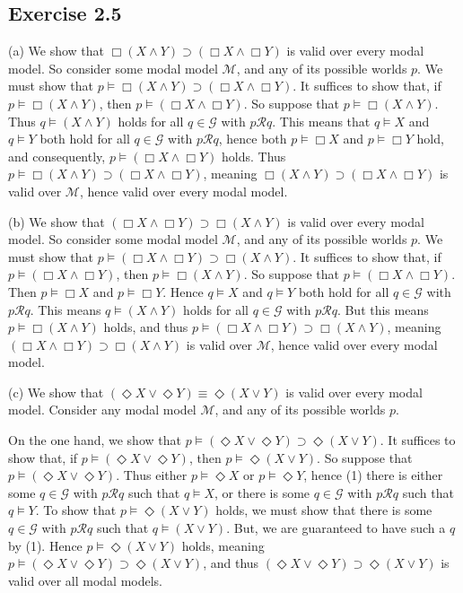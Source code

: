 \documentclass{article}
\theoremstyle{definition}
\begin{document}
\subsection*{Exercise 2.5}
(a) We show that $\Box (X\wedge Y)\supset (\Box X\wedge\Box Y)$ is valid over every modal model. So consider some 
modal model $\mathcal{M}$, and any of its possible worlds $p$. We must show that 
$p\vDash \Box (X\wedge Y)\supset (\Box X\wedge\Box Y)$. It suffices to show that, if 
$p\vDash\Box (X\wedge Y)$, then $p\vDash (\Box X\wedge\Box Y)$. So suppose that 
$p\vDash\Box (X\wedge Y)$. Thus $q\vDash (X\wedge Y)$ holds for all $q\in\mathcal{G}$ with $p\mathcal{R}q$. This means 
that $q\vDash X$ and $q\vDash Y$ both hold for all $q\in\mathcal{G}$ with $p\mathcal{R}q$, hence both 
$p\vDash\Box X$ and $p\vDash\Box Y$ hold, and consequently, $p\vDash (\Box X\wedge\Box Y)$ holds. Thus 
$p\vDash \Box (X\wedge Y)\supset (\Box X\wedge\Box Y)$, meaning 
$\Box (X\wedge Y)\supset (\Box X\wedge\Box Y)$ is valid over $\mathcal{M}$, hence valid over 
every modal model. 

(b) We show that $(\Box X\wedge\Box Y)\supset\Box (X\wedge Y)$ is valid over every modal model. 
So consider some modal model $\mathcal{M}$, and any of its possible worlds $p$. We must show that 
$p\vDash(\Box X\wedge\Box Y)\supset\Box (X\wedge Y)$. It suffices to show that, if
$p\vDash (\Box X\wedge\Box Y)$, then $p\vDash\Box (X\wedge Y)$. So suppose that
$p\vDash (\Box X\wedge\Box Y)$. Then $p\vDash\Box X$ and $p\vDash\Box Y$. Hence 
$q\vDash X$ and $q\vDash Y$ both hold for all $q\in\mathcal{G}$ with $p\mathcal{R}q$. This means 
$q\vDash (X\wedge Y)$ holds for all $q\in\mathcal{G}$ with $p\mathcal{R}q$. But this means 
$p\vDash\Box (X\wedge Y)$ holds, and thus $p\vDash(\Box X\wedge\Box Y)\supset\Box (X\wedge Y)$,
meaning $(\Box X\wedge\Box Y)\supset\Box (X\wedge Y)$ is valid over $\mathcal{M}$, hence valid over 
every modal model.

(c) We show that $(\Diamond X\vee\Diamond Y)\equiv\Diamond(X\vee Y)$ is valid over every modal model. Consider any 
modal model $\mathcal{M}$, and any of its possible worlds $p$.

On the one hand, we show that $p\vDash (\Diamond X\vee\Diamond Y)\supset\Diamond(X\vee Y)$. It suffices to show that, 
if $p\vDash (\Diamond X\vee\Diamond Y)$, then $p\vDash\Diamond(X\vee Y)$. So suppose that 
$p\vDash (\Diamond X\vee\Diamond Y)$. Thus either $p\vDash\Diamond X$ or $p\vDash\Diamond Y$, hence 
(1) there is either some $q\in\mathcal{G}$ with $p\mathcal{R}q$ such that $q\vDash X$, or there is some 
$q\in\mathcal{G}$ with $p\mathcal{R}q$ such that $q\vDash Y$. To show that $p\vDash\Diamond (X\vee Y)$ holds, we 
must show that there is some $q\in\mathcal{G}$ with $p\mathcal{R}q$ such that $q\vDash (X\vee Y)$. But, we are guaranteed to have 
such a $q$ by (1). Hence $p\vDash\Diamond (X\vee Y)$ holds, meaning $p\vDash (\Diamond X\vee\Diamond Y)\supset\Diamond(X\vee Y)$, and 
thus $(\Diamond X\vee\Diamond Y)\supset\Diamond(X\vee Y)$ is valid over all modal models.
\end{document}
